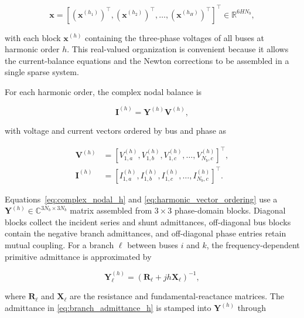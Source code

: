 \documentclass[journal]{IEEEtran}
\begin{document}
\begin{equation}
    \mathbf{x} =
    \left[
    \left(\mathbf{x}^{(h_1)}\right)^{\top},
    \left(\mathbf{x}^{(h_2)}\right)^{\top},\ldots,
    \left(\mathbf{x}^{(h_H)}\right)^{\top}
    \right]^{\top}
    \in \mathbb{R}^{6HN_b},
    \label{eq:mict_state}
\end{equation}

\noindent with each block $\mathbf{x}^{(h)}$ containing the three-phase
voltages of all buses at harmonic order $h$. This real-valued organization
is convenient because it allows the current-balance equations and the
Newton corrections to be assembled in a single sparse system.

For each harmonic order, the complex nodal balance is

\begin{equation}
    \mathbf{I}^{(h)}=\mathbf{Y}^{(h)}\mathbf{V}^{(h)},
    \label{eq:complex_nodal_h}
\end{equation}

\noindent with voltage and current vectors ordered by bus and phase as

\begin{equation}
\begin{aligned}
\mathbf{V}^{(h)}&=
\left[V_{1,a}^{(h)},V_{1,b}^{(h)},V_{1,c}^{(h)},\ldots,
V_{N_b,c}^{(h)}\right]^{\top},\\
\mathbf{I}^{(h)}&=
\left[I_{1,a}^{(h)},I_{1,b}^{(h)},I_{1,c}^{(h)},\ldots,
I_{N_b,c}^{(h)}\right]^{\top}.
\end{aligned}
\label{eq:harmonic_vector_ordering}
\end{equation}

Equations~\eqref{eq:complex_nodal_h} and
\eqref{eq:harmonic_vector_ordering} use a
$\mathbf{Y}^{(h)}\in\mathbb{C}^{3N_b\times3N_b}$ matrix assembled from
$3\times3$ phase-domain blocks. Diagonal blocks collect the incident series
and shunt admittances, off-diagonal bus blocks contain the negative branch
admittances, and off-diagonal phase entries retain mutual coupling. For a
branch $\ell$ between buses $i$ and $k$, the frequency-dependent primitive
admittance is approximated by

\begin{equation}
    \mathbf{Y}_{\ell}^{(h)} =
    \left(\mathbf{R}_{\ell}+jh\mathbf{X}_{\ell}\right)^{-1},
    \label{eq:branch_admittance_h}
\end{equation}

\noindent where $\mathbf{R}_{\ell}$ and $\mathbf{X}_{\ell}$ are the resistance
and fundamental-reactance matrices. The admittance in
\eqref{eq:branch_admittance_h} is stamped into $\mathbf{Y}^{(h)}$ through
\end{document}
